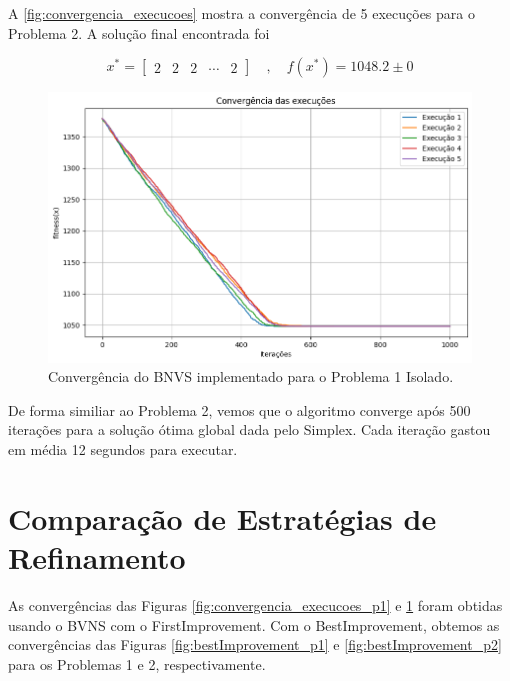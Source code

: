 \documentclass[
	12pt,				%
	oneside,			%
	a4paper,			%
	chapter=TITLE,
	sumario=tradicional,
	english,			%
	brazil				%
]{abntex2}
\begin{document}
A \autoref{fig:convergencia_execucoes} mostra a convergência de 5 execuções
para o Problema 2. A solução final encontrada foi 

\[  x^* = \begin{bmatrix} 2 & 2 & 2 & \cdots & 2 \end{bmatrix} \quad , \quad f\left(x^*\right) = 1048.2 \pm 0 \]

\begin{figure}[h!]
	\caption{\label{fig:convergencia_execucoes}Convergência do BNVS implementado para o Problema 1 Isolado.}
	\begin{center}
    \includegraphics[width=\textwidth,trim=1 1 1 1,clip]{convergencia_execucoes.png}
	\end{center}
\end{figure}

De forma similiar ao Problema 2, vemos que o algoritmo converge após 500 iterações para a solução 
ótima global dada pelo Simplex. Cada iteração gastou em média 12 segundos para executar.

\section{Comparação de Estratégias de Refinamento}

As convergências das Figuras \ref{fig:convergencia_execucoes_p1} e \ref{fig:convergencia_execucoes}
foram obtidas usando o BVNS com o FirstImprovement. Com o BestImprovement, obtemos 
as convergências das Figuras \ref{fig:bestImprovement_p1} e \ref{fig:bestImprovement_p2} para os Problemas 1 e 2, 
respectivamente.
\end{document}
